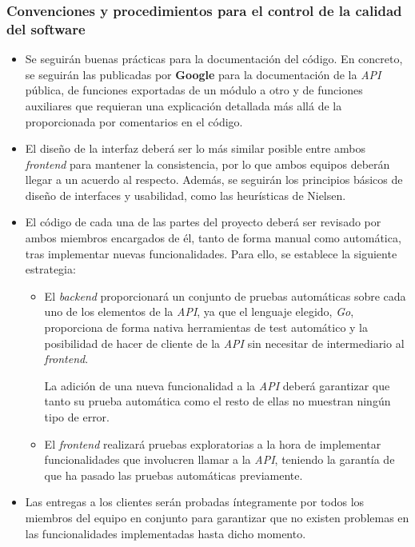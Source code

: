 \documentclass[11pt, a4paper, titlepage]{article}
\begin{document}
\subsubsection{Convenciones y procedimientos para el control de la calidad del software}

\begin{itemize}
    \item Se seguirán buenas prácticas para la documentación del código. En concreto, se seguirán las publicadas por \textbf{Google}\cite{documentaciongoogle} para la documentación de la \textit{API} pública, de funciones exportadas de un módulo a otro y de funciones auxiliares que requieran una explicación detallada más allá de la proporcionada por comentarios en el código.

    \item El diseño de la interfaz deberá ser lo más similar posible entre ambos \textit{frontend} para mantener la consistencia, por lo que ambos equipos deberán llegar a un acuerdo al respecto. Además, se seguirán los principios básicos de diseño de interfaces y usabilidad, como las heurísticas de Nielsen\cite{heuristicasnielsen}.

    \item El código de cada una de las partes del proyecto deberá ser revisado por ambos miembros encargados de él, tanto de forma manual como automática, tras implementar nuevas funcionalidades. Para  ello, se establece la siguiente estrategia:
    \begin{itemize}
        \item El \textit{backend} proporcionará un conjunto de pruebas automáticas sobre cada uno de los elementos de la \textit{API}, ya que el lenguaje elegido, \textit{Go}, proporciona de forma nativa herramientas de test automático y la posibilidad de hacer de cliente de la \textit{API} sin necesitar de intermediario al \textit{frontend}.

        La adición de una nueva funcionalidad a la \textit{API} deberá garantizar que tanto su prueba automática como el resto de ellas no muestran ningún tipo de error.

        \item El \textit{frontend} realizará pruebas exploratorias a la hora de implementar funcionalidades que involucren llamar a la \textit{API}, teniendo la garantía de que ha pasado las pruebas automáticas previamente.
        \end{itemize}


    \item Las entregas a los clientes serán probadas íntegramente por todos los miembros del equipo en conjunto para garantizar que no existen problemas en las funcionalidades implementadas hasta dicho momento.


\end{itemize}
\end{document}

